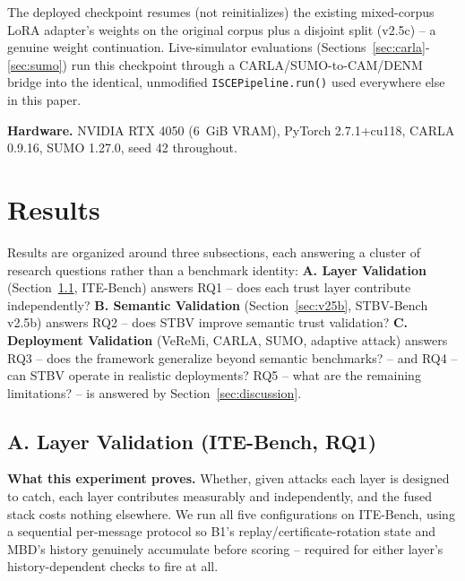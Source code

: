 \documentclass[conference]{IEEEtran}
\begin{document}
The deployed checkpoint resumes (not reinitializes) the existing mixed-corpus LoRA adapter's weights on the original corpus plus a disjoint split (v2.5c) -- a genuine weight continuation. Live-simulator evaluations (Sections~\ref{sec:carla}-\ref{sec:sumo}) run this checkpoint through a CARLA/SUMO-to-CAM/DENM bridge into the identical, unmodified \texttt{ISCEPipeline.run()} used everywhere else in this paper.

\textbf{Hardware.} NVIDIA RTX 4050 (6~GiB VRAM), PyTorch 2.7.1+cu118, CARLA 0.9.16, SUMO 1.27.0, seed 42 throughout.

\section{Results}
\label{sec:results}
Results are organized around three subsections, each answering a cluster of research questions rather than a benchmark identity: \textbf{A. Layer Validation} (Section~\ref{sec:itebench}, ITE-Bench) answers RQ1 -- does each trust layer contribute independently? \textbf{B. Semantic Validation} (Section~\ref{sec:v25b}, STBV-Bench v2.5b) answers RQ2 -- does STBV improve semantic trust validation? \textbf{C. Deployment Validation} (VeReMi, CARLA, SUMO, adaptive attack) answers RQ3 -- does the framework generalize beyond semantic benchmarks? -- and RQ4 -- can STBV operate in realistic deployments? RQ5 -- what are the remaining limitations? -- is answered by Section~\ref{sec:discussion}.

\subsection{A. Layer Validation (ITE-Bench, RQ1)}
\label{sec:itebench}
\textbf{What this experiment proves.} Whether, given attacks each layer is designed to catch, each layer contributes measurably and independently, and the fused stack costs nothing elsewhere. We run all five configurations on ITE-Bench, using a sequential per-message protocol so B1's replay/certificate-rotation state and MBD's history genuinely accumulate before scoring -- required for either layer's history-dependent checks to fire at all.
\end{document}

